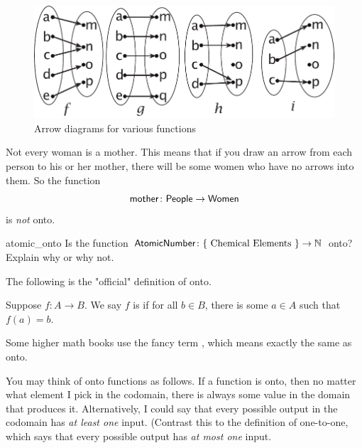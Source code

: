 \begin{center}
\begin{figure}[h]
\includegraphics[scale=0.6]{images/arrowonto.pdf}
\caption{Arrow diagrams for various functions}
\label{arrowontofig}
\end{figure}
\end{center}


\begin{example}{}
 Not every woman is a mother. 
This means that if you draw an arrow from each person to his or her mother, there will be some women who have no arrows into them. So the function 
\[ \sf{mother} \colon \sf{People} \to \sf{Women} \]
 is \emph{not} onto.
\end{example}

\begin{exercise}{atomic_onto}
Is the function $\sf{Atomic Number} \colon \{ \mbox{ Chemical Elements } \} \to \mathbb{N}$ onto?  Explain why or why not.
\end{exercise}

The following is the "official" definition  of onto.

\begin{defn}\label{ontoDef}
Suppose $f \colon A \to B$. We say $f$ is  if for all $b \in B$, 
there is some $a \in A$  such that $f(a) = b$. 
\end{defn}

Some higher math books use the fancy term , which means exactly the same as onto.

You may think of onto functions as follows. If a function is onto, then no matter what element I pick in the codomain, there is always some value in the domain that produces it. 
Alternatively, I could say that every possible output in the codomain has \emph{at least one} input.  (Contrast this to the definition of one-to-one, which says that every possible output has \emph{at most one} input.

